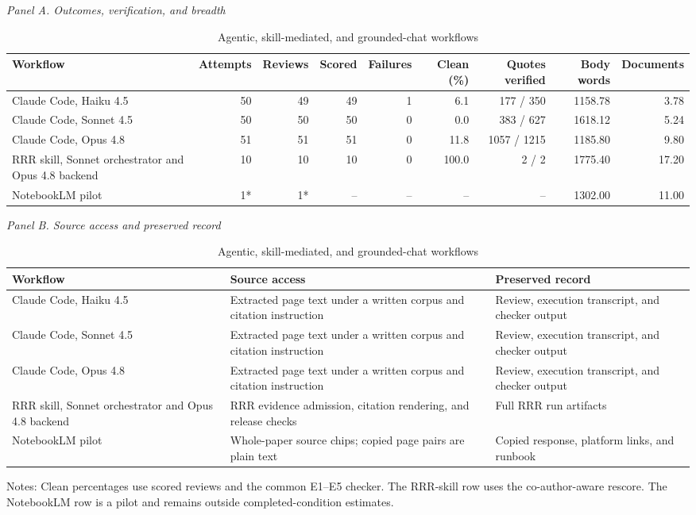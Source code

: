 \begin{table}[ht]
\centering
\caption{Agentic, skill-mediated, and grounded-chat workflows}
\begin{threeparttable}
\scriptsize
\textit{Panel A. Outcomes, verification, and breadth}\\[0.35em]
\begin{tabularx}{\textwidth}{Xrrrrrrrr}
\toprule
Workflow & Attempts & Reviews & Scored & Failures & Clean (\%) & Quotes verified & Body words & Documents \\
\midrule
Claude Code, Haiku 4.5 & 50 & 49 & 49 & 1 & 6.1 & 177 / 350 & 1158.78 & 3.78 \\
Claude Code, Sonnet 4.5 & 50 & 50 & 50 & 0 & 0.0 & 383 / 627 & 1618.12 & 5.24 \\
Claude Code, Opus 4.8 & 51 & 51 & 51 & 0 & 11.8 & 1057 / 1215 & 1185.80 & 9.80 \\
RRR skill, Sonnet orchestrator and Opus 4.8 backend & 10 & 10 & 10 & 0 & 100.0 & 2 / 2 & 1775.40 & 17.20 \\
NotebookLM pilot & 1* & 1* & -- & -- & -- & -- & 1302.00 & 11.00 \\
\bottomrule
\end{tabularx}
\par\vspace{0.7em}
\textit{Panel B. Source access and preserved record}\\[0.35em]
\begin{tabularx}{\textwidth}{p{4.2cm}XX}
\toprule
Workflow & Source access & Preserved record \\
\midrule
Claude Code, Haiku 4.5 & Extracted page text under a written corpus and citation instruction & Review, execution transcript, and checker output \\
Claude Code, Sonnet 4.5 & Extracted page text under a written corpus and citation instruction & Review, execution transcript, and checker output \\
Claude Code, Opus 4.8 & Extracted page text under a written corpus and citation instruction & Review, execution transcript, and checker output \\
RRR skill, Sonnet orchestrator and Opus 4.8 backend & RRR evidence admission, citation rendering, and release checks & Full RRR run artifacts \\
NotebookLM pilot & Whole-paper source chips; copied page pairs are plain text & Copied response, platform links, and runbook \\
\bottomrule
\end{tabularx}
\begin{tablenotes}[flushleft]\scriptsize
\item Notes: Clean percentages use scored reviews and the common E1--E5 checker. The RRR-skill row uses the co-author-aware rescore. The NotebookLM row is a pilot and remains outside completed-condition estimates.
\end{tablenotes}
\end{threeparttable}
\end{table}
